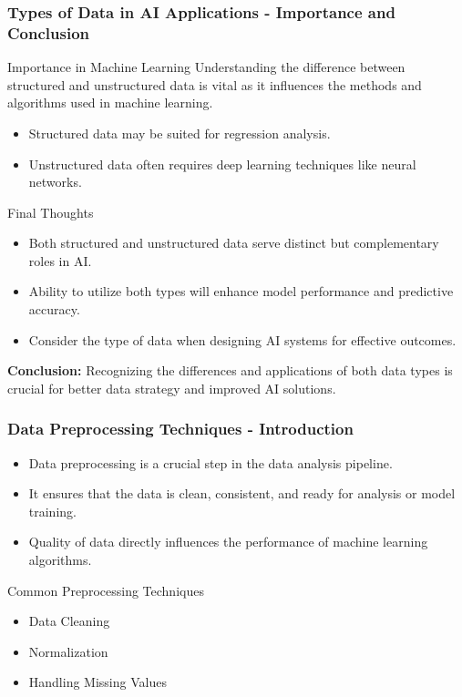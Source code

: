 \documentclass[aspectratio=169]{beamer}
\begin{document}
\begin{frame}[fragile]
    \frametitle{Types of Data in AI Applications - Importance and Conclusion}
    \begin{block}{Importance in Machine Learning}
        Understanding the difference between structured and unstructured data is vital as it influences the methods and algorithms used in machine learning. 
        \begin{itemize}
            \item Structured data may be suited for regression analysis.
            \item Unstructured data often requires deep learning techniques like neural networks.
        \end{itemize}
    \end{block}
    
    \begin{block}{Final Thoughts}
        \begin{itemize}
            \item Both structured and unstructured data serve distinct but complementary roles in AI.
            \item Ability to utilize both types will enhance model performance and predictive accuracy.
            \item Consider the type of data when designing AI systems for effective outcomes.
        \end{itemize}
    \end{block}
    
    \textbf{Conclusion:} Recognizing the differences and applications of both data types is crucial for better data strategy and improved AI solutions.
\end{frame}

\begin{frame}[fragile]
    \frametitle{Data Preprocessing Techniques - Introduction}
    \begin{itemize}
        \item Data preprocessing is a crucial step in the data analysis pipeline.
        \item It ensures that the data is clean, consistent, and ready for analysis or model training.
        \item Quality of data directly influences the performance of machine learning algorithms.
    \end{itemize}
    \begin{block}{Common Preprocessing Techniques}
        \begin{itemize}
            \item Data Cleaning
            \item Normalization
            \item Handling Missing Values
        \end{itemize}
    \end{block}
\end{frame}
\end{document}
